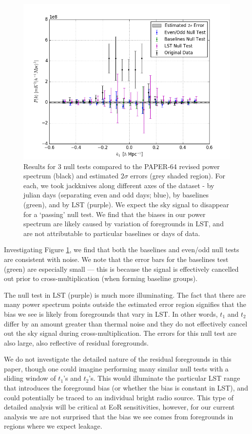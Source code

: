 \documentclass[preprint2,numberedappendix,tighten]{aastex6}  %
\begin{document}
\begin{figure}
	\centering
	\includegraphics[width=\columnwidth]{plots/null.png}
	\caption{Results for $3$ null tests compared to the PAPER-64 revised power spectrum (black) and estimated $2\sigma$ errors (grey shaded region). For each, we took jackknives along different axes of the dataset - by julian days (separating even and odd days; blue), by baselines (green), and by LST (purple). We expect the sky signal to disappear for a `passing' null test. We find that the biases in our power spectrum are likely caused by variation of foregrounds in LST, and are not attributable to particular baselines or days of data.}
	\label{fig:null}
\end{figure}

Investigating Figure \ref{fig:null}, we find that both the baselines and even/odd null tests are consistent with noise. We note that the error bars for the baselines test (green) are especially small --- this is because the signal is effectively cancelled out prior to cross-multiplication (when forming baseline groups). 

The null test in LST (purple) is much more illuminating. The fact that there are many power spectrum points outside the estimated error region signifies that the bias we see is likely from foregrounds that vary in LST. In other words, $t_{1}$ and $t_{2}$ differ by an amount greater than thermal noise and they do not effectively cancel out the sky signal during cross-multiplication. The errors for this null test are also large, also reflective of residual foregrounds. 

We do not investigate the detailed nature of the residual foregrounds in this paper, though one could imagine performing many similar null tests with a sliding window of $t_{1}$'s and $t_{2}$'s. This would illuminate the particular LST range that introduces the foreground bias (or whether the bias is constant in LST), and could potentially be traced to an individual bright radio source. This type of detailed analysis will be critical at EoR sensitivities, however, for our current analysis we are not surprised that the bias we see comes from foregrounds in regions where we expect leakage.
\end{document}
